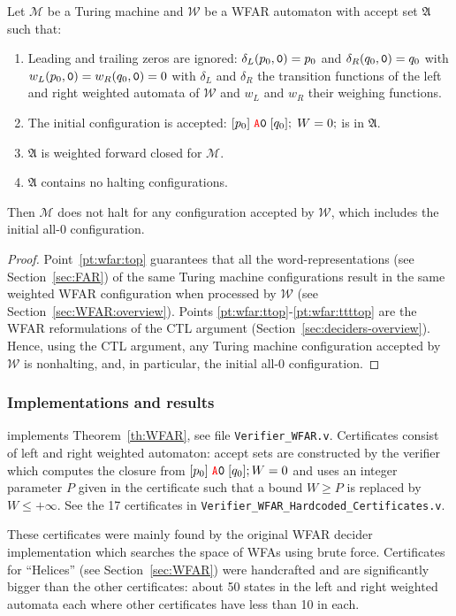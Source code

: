 \begin{theorem}\label{th:WFAR}
    Let $\mathcal{M}$ be a Turing machine and $\mathcal{W}$ be a WFAR automaton with accept set $\mathfrak{A}$ such that:
    \begin{enumerate}
        \item Leading and trailing zeros are ignored: $\delta_L(p_0,\texttt{0}) = p_0$ and $\delta_R(q_0,\texttt{0}) = q_0$ with $w_L(p_0,\texttt{0}) = w_R(q_0,\texttt{0}) = 0$ with $\delta_L$ and $\delta_R$ the transition functions of the left and right weighted automata of $\mathcal{W}$ and $w_L$ and $w_R$ their weighing functions.\label{pt:wfar:top}
        \item The initial configuration is accepted: \ie $[p_0]\; \texttt{\stateA}\szero\; [q_0];\; W=0;$ is in $\mathfrak{A}$.\label{pt:wfar:ttop}
        \item $\mathfrak{A}$ is weighted forward closed for $\mathcal{M}$.\label{pt:wfar:tttop}
        \item $\mathfrak{A}$ contains no halting configurations.\label{pt:wfar:ttttop}
    \end{enumerate}

    Then $\mathcal{M}$ does not halt for any configuration accepted by $\mathcal{W}$, which includes the initial all-0 configuration.
\end{theorem}
\begin{proof}
    Point~\ref{pt:wfar:top} guarantees that all the word-representations (see Section~\ref{sec:FAR}) of the same Turing machine configurations result in the same weighted WFAR configuration when processed by $\mathcal{W}$ (see Section~\ref{sec:WFAR:overview}). Points \ref{pt:wfar:ttop}-\ref{pt:wfar:ttttop} are the WFAR reformulations of the CTL argument (Section~\ref{sec:deciders-overview}). Hence, using the CTL argument, any Turing machine configuration accepted by $\mathcal{W}$ is nonhalting, and, in particular, the initial all-0 configuration.
\end{proof}





\subsubsection{Implementations and results}\label{sec:WFAR:results}

\CoqBB implements Theorem~\ref{th:WFAR}, see file \texttt{Verifier\_WFAR.v}. Certificates consist of left and right weighted automaton: accept sets are constructed by the \Coq verifier which computes the closure from $[p_0]\; \texttt{\stateA} \szero\; [q_0]; W=0$ and uses an integer parameter $P$ given in the certificate such that a bound $W \geq P$ is replaced by $W \leq +\infty$. See the 17 certificates in \texttt{Verifier\_WFAR\_Hardcoded\_Certificates.v}.

These certificates were mainly found by the original WFAR decider implementation \cite{iijil1_2025_14914502} which searches the space of WFAs using brute force. Certificates for ``Helices'' (see Section~\ref{sec:WFAR}) were handcrafted and are significantly bigger than the other certificates: about 50 states in the left and right weighted automata each where other certificates have less than 10 in each.